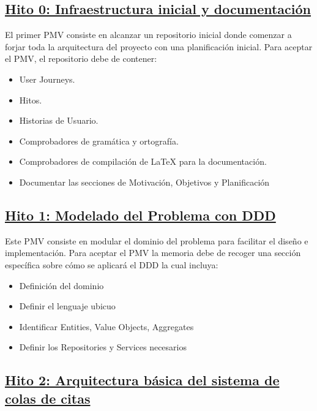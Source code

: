 \subsection*{\href{https://github.com/RubenDelgadoPareja/TFG-Triage-Inteligente-Consulta-Medica/milestone/1}{Hito 0: Infraestructura inicial y documentación}}
\label{sb:hito0}

El primer PMV consiste en alcanzar un repositorio inicial donde comenzar a forjar toda la arquitectura del proyecto con una planificación inicial.
Para aceptar el PMV, el repositorio debe de contener:

\begin{itemize}
    \item{User Journeys.}
    \item{Hitos.}
    \item{Historias de Usuario.}
    \item{Comprobadores de gramática y ortografía.}
    \item{Comprobadores de compilación de LaTeX para la documentación.}
    \item{Documentar las secciones de Motivación, Objetivos y Planificación}
\end{itemize}

\subsection*{\href{https://github.com/RubenDelgadoPareja/TFG-Triage-Inteligente-Consulta-Medica/milestone/7}{Hito 1: Modelado del Problema con DDD}}
\label{sb:hito1}

Este PMV consiste en modular el dominio del problema para facilitar el diseño e implementación.
Para aceptar el PMV la memoria debe de recoger una sección específica sobre cómo se aplicará el DDD la cual incluya:

\begin{itemize}
    \item {Definición del dominio}
    \item {Definir el lenguaje ubicuo}
    \item {Identificar Entities, Value Objects, Aggregates}
    \item {Definir los Repositories y Services necesarios}
\end{itemize}


\subsection*{\href{https://github.com/RubenDelgadoPareja/TFG-Triage-Inteligente-Consulta-Medica/milestone/2}{Hito 2: Arquitectura básica del sistema de colas de citas}}

